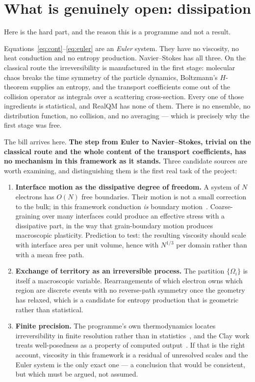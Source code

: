 \documentclass[11pt]{article}
\begin{document}
\section{What is genuinely open: dissipation}\label{sec:open}

Here is the hard part, and the reason this is a programme and not a result.

Equations~\eqref{eq:cont}--\eqref{eq:euler} are an \emph{Euler} system. They have no viscosity, no
heat conduction and no entropy production. Navier--Stokes has all three. On the classical route the
irreversibility is manufactured in the first stage: molecular chaos breaks the time symmetry of the
particle dynamics, Boltzmann's $H$-theorem supplies an entropy, and the transport coefficients come
out of the collision operator as integrals over a scattering cross-section. Every one of those
ingredients is statistical, and RealQM has none of them. There is no ensemble, no distribution
function, no collision, and no averaging --- which is precisely why the first stage was free.

The bill arrives here. \textbf{The step from Euler to Navier--Stokes, trivial on the classical route
and the whole content of the transport coefficients, has no mechanism in this framework as it
stands.} Three candidate sources are worth examining, and distinguishing them is the first real task
of the project:

\begin{enumerate}\itemsep3pt
\item \textbf{Interface motion as the dissipative degree of freedom.} A system of $N$ electrons has
$O(N)$ free boundaries. Their motion is not a small correction to the bulk; in this framework
conduction \emph{is} boundary motion~\cite{gas}. Coarse-graining over many interfaces could produce
an effective stress with a dissipative part, in the way that grain-boundary motion produces
macroscopic plasticity. Prediction to test: the resulting viscosity should scale with interface
area per unit volume, hence with $N^{1/3}$ per domain rather than with a mean free path.
\item \textbf{Exchange of territory as an irreversible process.} The partition $\{\Omega_i\}$ is
itself a macroscopic variable. Rearrangements of which electron owns which region are discrete
events with no reverse-path symmetry once the geometry has relaxed, which is a candidate for entropy
production that is geometric rather than statistical.
\item \textbf{Finite precision.} The programme's own thermodynamics locates irreversibility in
finite resolution rather than in statistics~\cite{bodysoul}, and the Clay work treats
well-posedness as a property of computed output~\cite{clay}. If that is the right account, viscosity
in this framework is a residual of unresolved scales and the Euler system is the only exact one ---
a conclusion that would be consistent, but which must be argued, not assumed.
\end{enumerate}
\end{document}
